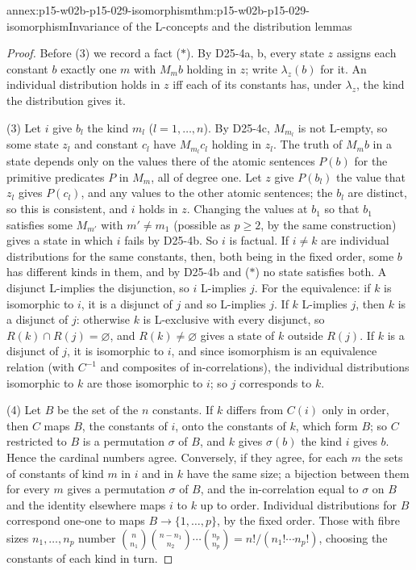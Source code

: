 \begin{annexitem}{annex:p15-w02b-p15-029-isomorphism}{thm:p15-w02b-p15-029-isomorphism}{Invariance of the L-concepts and the distribution lemmas}
\begin{proof}
Before (3) we record a fact (\(*\)). By D25-4a, b, every state \(z\)
assigns each constant \(b\) exactly one \(m\) with \(M_mb\) holding in
\(z\); write \(\lambda_z(b)\) for it. An individual distribution holds in
\(z\) iff each of its constants has, under \(\lambda_z\), the kind the
distribution gives it.

(3) Let \(i\) give \(b_l\) the kind \(m_l\) (\(l=1,\ldots,n\)). By
D25-4c, \(M_{m_l}\) is not L-empty, so some state \(z_l\) and constant
\(c_l\) have \(M_{m_l}c_l\) holding in \(z_l\). The truth of \(M_mb\) in
a state depends only on the values there of the atomic sentences
\(P(b)\) for the primitive predicates \(P\) in \(M_m\), all of degree
one. Let \(z\) give \(P(b_l)\) the value that \(z_l\) gives \(P(c_l)\),
and any values to the other atomic sentences; the \(b_l\) are distinct,
so this is consistent, and \(i\) holds in \(z\). Changing the values at
\(b_1\) so that \(b_1\) satisfies some \(M_{m'}\) with \(m'\ne m_1\)
(possible as \(p\geq2\), by the same construction) gives a state in
which \(i\) fails by D25-4b. So \(i\) is factual. If \(i\ne k\) are
individual distributions for the same constants, then, both being in the
fixed order, some \(b\) has different kinds in them, and by D25-4b and
(\(*\)) no state satisfies both. A disjunct L-implies the disjunction,
so \(i\) L-implies \(j\). For the equivalence: if \(k\) is isomorphic
to \(i\), it is a disjunct of \(j\) and so L-implies \(j\). If \(k\)
L-implies \(j\), then \(k\) is a disjunct of \(j\): otherwise \(k\) is
L-exclusive with every disjunct, so \(R(k)\cap R(j)=\varnothing\), and
\(R(k)\ne\varnothing\) gives a state of \(k\) outside \(R(j)\). If \(k\)
is a disjunct of \(j\), it is isomorphic to \(i\), and since isomorphism
is an equivalence relation (with \(C^{-1}\) and composites of
in-correlations), the individual distributions isomorphic to \(k\) are
those isomorphic to \(i\); so \(j\) corresponds to \(k\).

(4) Let \(B\) be the set of the \(n\) constants. If \(k\) differs from
\(C(i)\) only in order, then \(C\) maps \(B\), the constants of \(i\),
onto the constants of \(k\), which form \(B\); so \(C\) restricted to
\(B\) is a permutation \(\sigma\) of \(B\), and \(k\) gives \(\sigma(b)\)
the kind \(i\) gives \(b\). Hence the cardinal numbers agree.
Conversely, if they agree, for each \(m\) the sets of constants of kind
\(m\) in \(i\) and in \(k\) have the same size; a bijection between
them for every \(m\) gives a permutation \(\sigma\) of \(B\), and the
in-correlation equal to \(\sigma\) on \(B\) and the identity elsewhere
maps \(i\) to \(k\) up to order. Individual distributions for \(B\)
correspond one-one to maps \(B\to\{1,\ldots,p\}\), by the fixed order.
Those with fibre sizes \(n_1,\ldots,n_p\) number
\(\binom n{n_1}\binom{n-n_1}{n_2}\cdots\binom{n_p}{n_p}=n!/(n_1!\cdots n_p!)\),
choosing the constants of each kind in turn.


\end{proof}
\end{annexitem}
